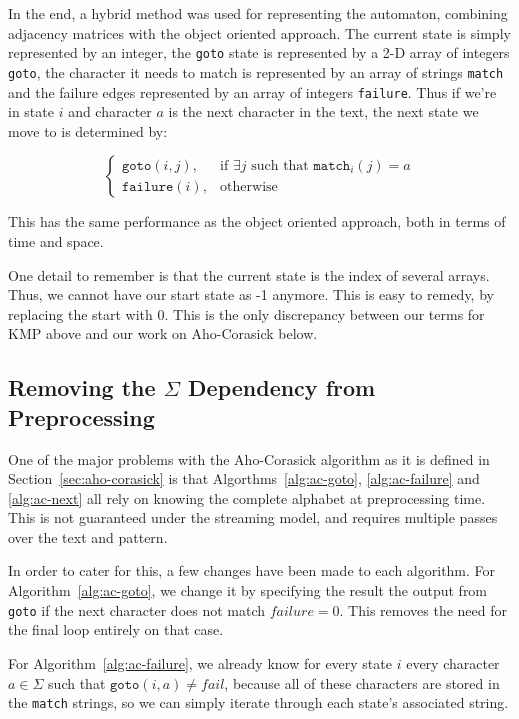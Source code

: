 \documentclass[ %
                    author={Dominic Joseph Moylett},
                    degree={MEng},
                     title={Dictionary Matching with Fingerprints},
                  subtitle={An Empirical Analysis},
                      type={research},
                      year={2015} ]{dissertation}
\begin{document}
In the end, a hybrid method was used for representing the automaton, combining adjacency matrices with the object oriented approach. The current state is simply represented by an integer, the \texttt{goto} state is represented by a 2-D array of integers \texttt{goto}, the character it needs to match is represented by an array of strings \texttt{match} and the failure edges represented by an array of integers \texttt{failure}. Thus if we're in state $i$ and character $a$ is the next character in the text, the next state we move to is determined by:

\[
  \begin{cases}
    \texttt{goto}(i, j),& \text{if } \exists j \text{ such that } \texttt{match}_i(j) = a\\
    \texttt{failure}(i),& \text{otherwise}
  \end{cases}
\]

This has the same performance as the object oriented approach, both in terms of time and space.

One detail to remember is that the current state is the index of several arrays. Thus, we cannot have our start state as -1 anymore. This is easy to remedy, by replacing the start with 0. This is the only discrepancy between our terms for KMP above and our work on Aho-Corasick below.

\subsection{Removing the $\Sigma$ Dependency from Preprocessing}
\label{ssec:ac-hashing}

One of the major problems with the Aho-Corasick algorithm as it is defined in Section~\ref{sec:aho-corasick} is that Algorthms~\ref{alg:ac-goto}, \ref{alg:ac-failure} and \ref{alg:ac-next} all rely on knowing the complete alphabet at preprocessing time. This is not guaranteed under the streaming model, and requires multiple passes over the text and pattern.

In order to cater for this, a few changes have been made to each algorithm. For Algorithm~\ref{alg:ac-goto}, we change it by specifying the result the output from \texttt{goto} if the next character does not match $failure = 0$. This removes the need for the final loop entirely on that case.

For Algorithm~\ref{alg:ac-failure}, we already know for every state $i$ every character $a \in \Sigma$ such that $\texttt{goto}(i, a) \neq fail$, because all of these characters are stored in the \texttt{match} strings, so we can simply iterate through each state's associated string.
\end{document}
